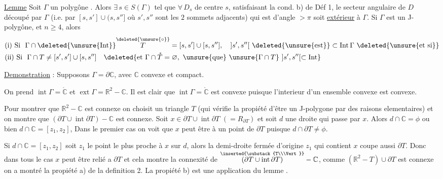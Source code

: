 \uline{Lemme} Soit $\Gamma$ un polygône  . Alors $\exists\,s\in S(\Gamma)$  tel que $\forall\,D_s$ de centre $s$,  satisfaisant la cond. b) de Déf 1, le secteur angulaire de $D$ découpé par $\Gamma$ (i.e. par $[s,s']\cup(s,s'']$ où $s',s''$ sont les $2$ sommets adjacents) qui est d'angle $>\pi$ soit \uline{extérieur} à $\Gamma$. Si $\Gamma$ est un J-polygône, et $n\ge4$, alors
\[
\begin{aligned}
&\text{(i) Si }\ \Gamma\cap\deleted{\unsure{\operatorname{Int}}}\overset{\deleted{\unsure{\circ}}}{T}=[s,s']\cup[s,s''],\quad ]s',s''[\ \deleted{\unsure{\text{est}}}\subset\operatorname{Int}\Gamma\ \text{\deleted{\unsure{et si}}}\\
&\text{(ii) Si }\ \Gamma\cap T\ne[s',s']\cup[s,s'']\quad
\deleted{\text{et }\Gamma\cap\mathring{T}=\varnothing,\ \unsure{\text{que}}\ \unsure{\Gamma\cap T}\ ]s',s''[\subset\operatorname{Int}}
\end{aligned}
\]

\uline{Demonstration} : Supposons $\Gamma=\partial\mathbb{C}$, avec $\mathbb{C}$ convexe et compact.

On prend $\operatorname{int}\Gamma=\mathring{\mathbb{C}}$ et $\operatorname{ext}\Gamma=\mathbb{R}^{2}-\mathbb{C}$. Il est clair que $\operatorname{int}\Gamma=\mathring{\mathbb{C}}$ est convexe puisque l'interieur d'un ensemble convexe est convexe.

Pour montrer que $\mathbb{R}^{2}-\mathbb{C}$ est connexe on choisit un triangle $T$ (qui vérifie la propiété d'être un J-polygone par des raisons elementaires) et on montre que $(\partial T\cup\operatorname{int}\partial T)-\mathbb{C}$ est connexe. Soit $x\in\partial T\cup\operatorname{int}\partial T$  $(=R_{\partial T})$  et soit $d$ une droite qui passe par $x$. Alors $d\cap\mathbb{C}=\phi$ ou bien $d\cap\mathbb{C}=[z_1,z_2]$, Dans le premier cas on voit que $x$ peut être  à un point de $\partial T$ puisque $d\cap\partial T\ne\phi$.

Si $d\cap\mathbb{C}=[z_1,z_2]$ soit $z_1$ le point  le plus proche à $x$ sur $d$, alors la demi-droite fermée d'origine $z_1$ qui contient $x$ coupe aussi $\partial T$. Donc dans tous le cas $x$ peut être relié a $\partial T$ et cela montre la connexité de $\overset{\inserted{\substack{T\\\Vert}}}{(\partial T\cup\operatorname{int}\partial T)}-\mathbb{C}$, comme $(\mathbb{R}^{2}-T)\cup\partial T$ est connexe  on a montré la propiété a) de la definition 2. La propiété b) est une application  du lemme .

